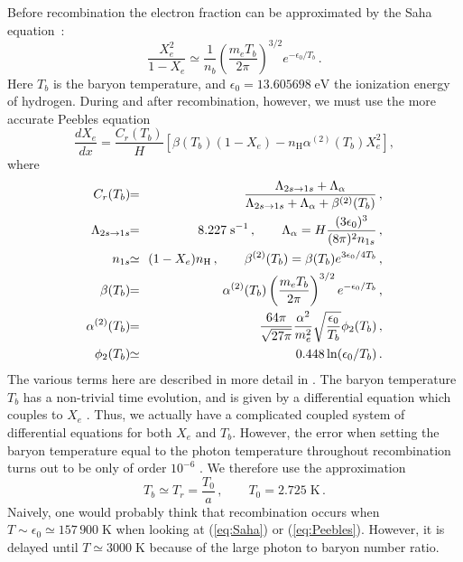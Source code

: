 \documentclass[twocolumn,nofootinbib,amsmath,amssymb]{revtex4}
\newcommand{\be}{\begin{equation}}
\newcommand{\ee}{\end{equation}}
\newcommand{\ba}{\begin{eqnarray}}
\newcommand{\ea}{\end{eqnarray}}
\newcommand{\hs}{\hspace{-1.12mm}}
\newcommand{\eq}{\hs & = & \hs}
\newcommand{\eqsimeq}{\hs & \simeq & \hs}
\newcommand{\kelvin}{\mathrm{K}}
\newcommand{\second}{\mathrm{s}}
\newcommand{\hydr}{\mathrm{H}}
\newcommand{\ev}{\mathrm{eV}}
\begin{document}
Before recombination the electron fraction can be approximated by the Saha
equation~\cite{Dodelson, Ma_Bert, Hu}:
\be
  \frac{X_e^2}{1-X_e} \simeq \frac{1}{n_b}
    \left( \frac{m_e T_b}{2\pi} \right)^{3/2} e^{-\epsilon_0/T_b} \, .
  \label{eq:Saha}
\ee
Here $T_b$ is the baryon temperature, and $\epsilon_0 = 13.605698 \; \ev$ the
ionization energy of hydrogen. During and after recombination, however, we must
use the more accurate Peebles equation~\cite{Dodelson, Ma_Bert}
\be
  \frac{dX_e}{dx} = \frac{C_r(T_b)}{H} \left[
    \beta(T_b) (1-X_e) - n_\hydr \alpha^{(2)}(T_b) X_e^2
  \right] ,
  \label{eq:Peebles}
\ee
where
\ba
  C_r(T_b) \eq \frac{\Lambda_{2s \to 1s} + \Lambda_\alpha}
    {\Lambda_{2s \to 1s} + \Lambda_\alpha + \beta^{(2)}(T_b)} \, , \nonumber \\
  \Lambda_{2s \to 1s} \eq 8.227 \; \second^{-1} \, ,
    \qquad \Lambda_\alpha = H \frac{(3\epsilon_0)^3}{(8\pi)^2 n_{1s}} \, ,
    \nonumber \\
  n_{1s} \eqsimeq (1-X_e) n_\hydr \, ,
    \qquad \beta^{(2)}(T_b) = \beta(T_b) e^{3\epsilon_0/4T_b} \, , \nonumber \\
  \beta(T_b) \eq \alpha^{(2)}(T_b) \left( \frac{m_e T_b}{2\pi} \right)^{3/2}
    e^{-\epsilon_0/T_b} \, , \nonumber \\
  \alpha^{(2)}(T_b) \eq \frac{64\pi}{\sqrt{27\pi}} \frac{\alpha^2}{m_e^2}
    \sqrt{\frac{\epsilon_0}{T_b}} \phi_2(T_b) \, , \nonumber \\
  \phi_2(T_b) \eqsimeq 0.448 \ln(\epsilon_0/T_b) \, .
  \label{eq:Peebles_def}
\ea
The various terms here are described in more detail in \cite{Ma_Bert}. The
baryon temperature $T_b$ has a non-trivial time evolution, and is given by a
differential equation which couples to $X_e$ \cite{Ma_Bert}. Thus, we actually
have a complicated coupled system of differential equations for both $X_e$ and
$T_b$. However, the error when setting the baryon temperature equal to the
photon temperature throughout recombination turns out to be only of order
$10^{-6}$ \cite{Reijo}. We therefore use the approximation
\be
  T_b \simeq T_r = \frac{T_0}{a} \, , \qquad
  T_0 = 2.725 \; \kelvin \, .
\ee
Naively, one would probably think that recombination occurs when $T \sim
\epsilon_0 \simeq 157\,900 \;\kelvin$ when looking at (\ref{eq:Saha}) or
(\ref{eq:Peebles}). However, it is delayed until $T \simeq 3000 \;\kelvin$
because of the large photon to baryon number ratio.
\end{document}
